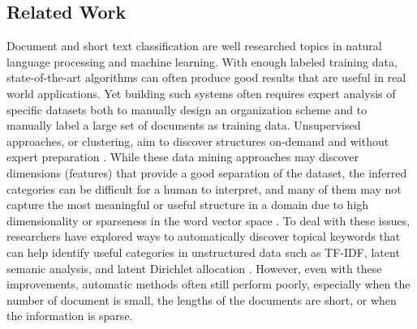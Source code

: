 \subsection{Related Work}


Document and short text classification are well researched topics in natural
language processing and machine learning. With enough labeled training data,
state-of-the-art algorithms can often produce good results that are useful
in real world applications. Yet building such systems often requires expert
analysis of specific datasets both to manually design an organization scheme and
to manually label a large set of documents as training data. Unsupervised approaches, 
or clustering,
aim to discover structures on-demand and without expert preparation
\cite{jain1988algorithms,hartigan1975clustering,steinbach2000comparison}.
While these
data mining approaches may discover dimensions (features) that provide a good
separation of the dataset, the inferred categories can be difficult for a human
to interpret, and many of them may not capture the most meaningful or useful
structure in a domain due to high dimensionality or sparseness in the word vector space 
\cite{Bellman:2003:DP:862270,kriegel2009clustering}.
To deal with these issues, researchers have explored ways to automatically
discover topical keywords that can help identify useful categories in unstructured data
such as TF-IDF, latent semanic analysis, and latent
Dirichlet allocation \cite{manning2008introduction,Jones72astatistical,deerwester1990indexing,blei2003latent}.
However, even with these improvements, automatic methods often still
perform poorly, especially when the number of document is small, the lengths
of the documents are short, or when the information is sparse.


